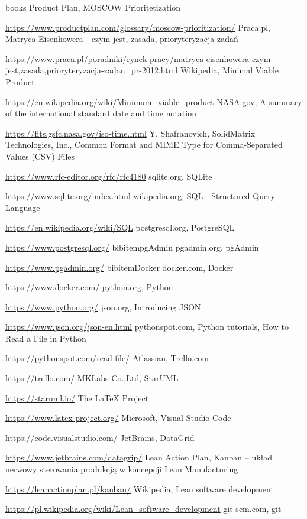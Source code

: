 \documentclass[a4paper,10pt, twoside]{report}
\begin{document}
\begin{large}
\begin{thebibliography} {books}
     Product Plan, MOSCOW Prioritetization \raggedright\url{
        https://www.productplan.com/glossary/moscow-prioritization/}
    Praca.pl, Matryca Eisenhowera - czym jest, zasada, prioryteryzacja zadań \raggedright\url{
        https://www.praca.pl/poradniki/rynek-pracy/matryca-eisenhowera-czym-jest,zasada,prioryteryzacja-zadan_pr-2012.html}
     Wikipedia, Minimal Viable Product \raggedright\url{
        https://en.wikipedia.org/wiki/Minimum_viable_product}
     NASA.gov, A summary of the international standard date and time notation \raggedright\url{
        https://fits.gsfc.nasa.gov/iso-time.html}
     Y. Shafranovich, SolidMatrix Technologies, Inc., Common Format and MIME Type for Comma-Separated Values (CSV) Files \raggedright\url{
        https://www.rfc-editor.org/rfc/rfc4180}
     sqlite.org, SQLite \raggedright\url{
        https://www.sqlite.org/index.html}
     wikipedia.org, SQL - Structured Query Language \raggedright\url{
        https://en.wikipedia.org/wiki/SQL}
     postgresql.org, PostgreSQL \raggedright\url{
        https://www.postgresql.org/}
    bibitem{pgAdmin} pgadmin.org, pgAdmin \raggedright\url{
        https://www.pgadmin.org/}
    bibitem{Docker} docker.com, Docker \raggedright\url{
        https://www.docker.com/}
     python.org, Python \raggedright\url{
        https://www.python.org/}
     json.org, Introducing JSON \raggedright\url{
        https://www.json.org/json-en.html}
     pythonspot.com, Python tutorials, How to Read a File in Python \raggedright\url{
        https://pythonspot.com/read-file/}
     Atlassian, Trello.com \raggedright\url{
        https://trello.com/}
     MKLabs Co.,Ltd, StarUML \raggedright\url{
        https://staruml.io/}
     The LaTeX Project \raggedright\url{
        https://www.latex-project.org/}
     Microsoft, Visual Studio Code \raggedright\url{
        https://code.visualstudio.com/}
     JetBrains, DataGrid \raggedright\url{
        https://www.jetbrains.com/datagrip/}
     Lean Action Plan, Kanban – układ nerwowy sterowania produkcją w koncepcji Lean Manufacturing \raggedright\url{
        https://leanactionplan.pl/kanban/}
     Wikipedia, Lean software development \raggedright\url{
        https://pl.wikipedia.org/wiki/Lean_software_development}
     git-scm.com, git \raggedright\url{
}
\end{thebibliography}
\end{large}
\end{document}
